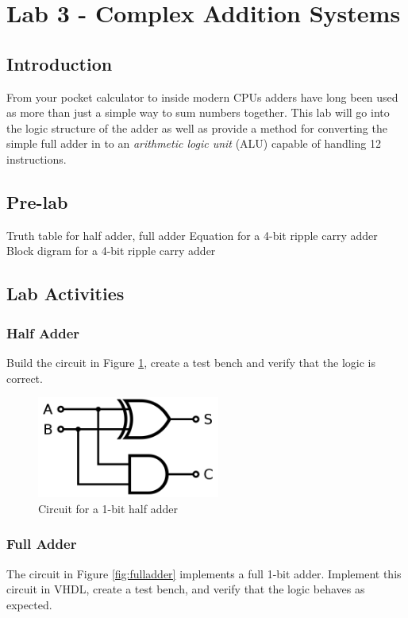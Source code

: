 \section{Lab 3 - Complex Addition Systems}

\subsection{Introduction}
From your pocket calculator to inside modern CPUs adders have long been used as more than just a simple way to sum numbers together. This lab will go into the logic structure of the adder as well as provide a method for converting the simple full adder in to an \emph{arithmetic logic unit} (ALU) capable of handling 12 instructions. 

\subsection{Pre-lab}
 Truth table for half adder, full adder
Equation for a 4-bit ripple carry adder
 Block digram for a 4-bit ripple carry adder

\subsection{Lab Activities}

\subsubsection{Half Adder}
Build the circuit in Figure \ref{fig:halfadder}, create a test bench and verify that the logic is correct.

\begin{figure}[H]
	\centering
	\includegraphics[width=60mm]{Lab3/figures/halfadder.png}
	\caption{Circuit for a 1-bit half adder}
	\label{fig:halfadder}
\end{figure}

\subsubsection{Full Adder}
The circuit in Figure \ref{fig:fulladder} implements a full 1-bit adder. Implement this circuit in VHDL, create a test bench, and verify that the logic behaves as expected. 

